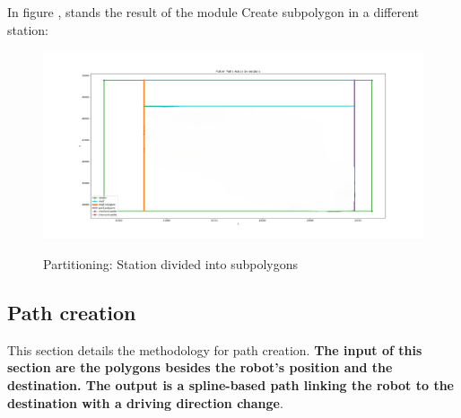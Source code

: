 In figure , stands the result of the module Create subpolygon in a different station:
\begin{figure}[H]
    \begin{center}
        \includegraphics[width=5in]{images/Chap2/Other_station.png}\\
        \caption{Partitioning: Station divided into subpolygons}
        \label{other station}
        \end{center}    
\end{figure}

\subsection{Path creation}
This section details the methodology for path creation. \textbf{The input of this section are the polygons besides
the robot's position and the destination. The output is a spline-based path linking the robot to the destination with a 
driving direction change}.

